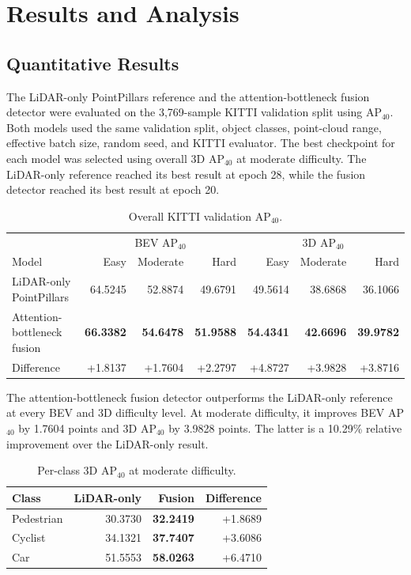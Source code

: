 \section{Results and Analysis}

\subsection{Quantitative Results}

The LiDAR-only PointPillars reference and the attention-bottleneck fusion
detector were evaluated on the 3,769-sample KITTI validation split using
AP$_{40}$. Both models used the same validation split, object classes,
point-cloud range, effective batch size, random seed, and KITTI evaluator.
The best checkpoint for each model was selected using overall 3D AP$_{40}$ at
moderate difficulty. The LiDAR-only reference reached its best result at epoch
28, while the fusion detector reached its best result at epoch 20.

\begin{table}[ht]
\centering
\caption{Overall KITTI validation AP$_{40}$.}
\label{tab:overall_results}
\begin{tabular}{lrrrrrr}
\hline
& \multicolumn{3}{c}{BEV AP$_{40}$} &
\multicolumn{3}{c}{3D AP$_{40}$} \\
Model & Easy & Moderate & Hard & Easy & Moderate & Hard \\
\hline
LiDAR-only PointPillars
& 64.5245 & 52.8874 & 49.6791 & 49.5614 & 38.6868 & 36.1066 \\
Attention-bottleneck fusion
& \textbf{66.3382} & \textbf{54.6478} & \textbf{51.9588}
& \textbf{54.4341} & \textbf{42.6696} & \textbf{39.9782} \\
\hline
Difference
& +1.8137 & +1.7604 & +2.2797 & +4.8727 & +3.9828 & +3.8716 \\
\hline
\end{tabular}
\end{table}

The attention-bottleneck fusion detector outperforms the LiDAR-only reference
at every BEV and 3D difficulty level. At moderate difficulty, it improves BEV
AP$_{40}$ by 1.7604 points and 3D AP$_{40}$ by 3.9828 points. The latter is a
10.29\% relative improvement over the LiDAR-only result.

\begin{table}[ht]
\centering
\caption{Per-class 3D AP$_{40}$ at moderate difficulty.}
\label{tab:per_class_results}
\begin{tabular}{lrrr}
\hline
Class & LiDAR-only & Fusion & Difference \\
\hline
Pedestrian & 30.3730 & \textbf{32.2419} & +1.8689 \\
Cyclist & 34.1321 & \textbf{37.7407} & +3.6086 \\
Car & 51.5553 & \textbf{58.0263} & +6.4710 \\
\hline
\end{tabular}
\end{table}

